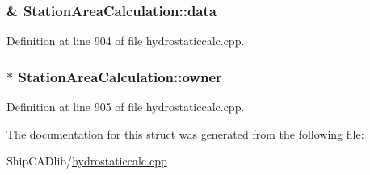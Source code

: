 \subsubsection[{\texorpdfstring{data}{data}}]{\& Station\+Area\+Calculation\+::data}\hypertarget{structStationAreaCalculation_ad1b380c3cc7135b5d659c7efb5a961c2}{}\label{structStationAreaCalculation_ad1b380c3cc7135b5d659c7efb5a961c2}


Definition at line 904 of file hydrostaticcalc.\+cpp.

\subsubsection[{\texorpdfstring{owner}{owner}}]{$\ast$ Station\+Area\+Calculation\+::owner}\hypertarget{structStationAreaCalculation_a84d2ad6a33b1d6e2db182bebf0a5d7af}{}\label{structStationAreaCalculation_a84d2ad6a33b1d6e2db182bebf0a5d7af}


Definition at line 905 of file hydrostaticcalc.\+cpp.



The documentation for this struct was generated from the following file\+:\begin{DoxyCompactItemize}
\item 
Ship\+C\+A\+Dlib/\hyperlink{hydrostaticcalc_8cpp}{hydrostaticcalc.\+cpp}\end{DoxyCompactItemize}
